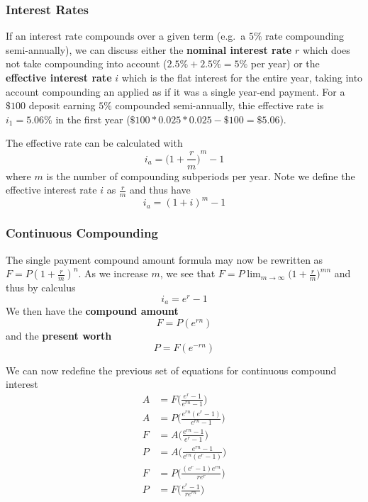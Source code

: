 \documentclass[12pt]{article}
\begin{document}
\subsubsection{Interest Rates}
If an interest rate compounds over a given term (e.g.\ a $5\%$ rate compounding semi-annually), we can discuss either the {\bf nominal interest rate} $r$ which does not take compounding into account ($2.5\% + 2.5\% = 5\%$ per year) or the {\bf effective interest rate} $i$ which is the flat interest for the entire year, taking into account compounding an applied as if it was a single year-end payment. For a $\$100$ deposit earning $5\%$ compounded semi-annually, thie effective rate is $i_1 = 5.06\%$ in the first year ($\$100 * 0.025 * 0.025 - \$100 = \$5.06$).

The effective rate can be calculated with \[ i_a = {\bigg(1 + \frac{r}{m} \bigg)}^m - 1 \] where $m$ is the number of compounding subperiods per year. Note we define the effective interest rate $i$ as $\frac{r}{m}$ and thus have \[ i_a = {(1 + i )}^m - 1 \]

\subsubsection{Continuous Compounding}
The single payment compound amount formula may now be rewritten as $F = P{(1 + \frac{r}{m})}^n$. As we increase $m$, we see that $F = P \displaystyle\lim_{m\to\infty} {\bigg(1 + \frac{r}{m} \bigg)}^{mn}$ and thus by calculus \[ i_a = e^r - 1 \] We then have the {\bf compound amount} \[ F = P(e^{rn}) \] and the {\bf present worth} \[ P = F(e^{-rn}) \]

We can now redefine the previous set of equations for continuous compound interest
\begin{align*}
A &= F \bigg( \frac{e^r - 1}{e^{rn} - 1} \bigg)\\
A &= P \bigg( \frac{e^{rn}(e^r - 1)}{e^{rn} - 1} \bigg)\\
F &= A \bigg( \frac{e^{rn} - 1}{e^r - 1} \bigg)\\
P &= A \bigg( \frac{e^{rn} - 1}{e^{rn}(e^r - 1)} \bigg)\\
F &= P \bigg( \frac{(e^r - 1)e^{rn}}{re^r} \bigg)\\
P &= F \bigg( \frac{e^r - 1}{re^{rn}} \bigg)\\
\end{align*}
\end{document}
